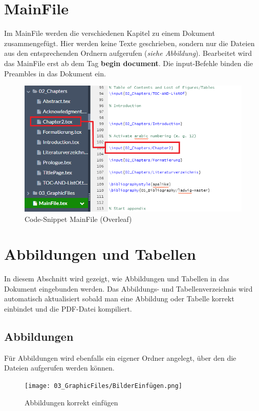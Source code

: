 \section{MainFile}\label{cha:mainFile}
Im MainFile werden die verschiedenen Kapitel zu einem Dokument zusammengefügt. Hier werden keine Texte geschrieben, sondern nur die Dateien aus den entsprechenden Ordnern aufgerufen (\emph{siehe Abbildung}). Bearbeitet wird das MainFile erst ab dem Tag \textbf{begin document}. Die input-Befehle binden die Preambles in das Dokument ein.

\begin{figure}[H]
    \centering
    \includegraphics[width=\textwidth]{03_GraphicFiles/MainFile.png}
    \caption{Code-Snippet MainFile (Overleaf)}
    \label{fig:mainFile}
\end{figure}

\section{Abbildungen und Tabellen}
In diesem Abschnitt wird gezeigt, wie Abbildungen und Tabellen in das Dokument eingebunden werden. Das Abbildungs- und Tabellenverzeichnis wird automatisch aktualisiert sobald man eine Abbildung oder Tabelle korrekt einbindet und die PDF-Datei kompiliert.

\subsection{Abbildungen} \label{cha:figures}
Für Abbildungen wird ebenfalls ein eigener Ordner angelegt, über den die Dateien aufgerufen werden können.

\begin{figure}[H]
    \centering
    \texttt{[image: 03\_GraphicFiles/BilderEinfügen.png]}
    \caption{Abbildungen korrekt einfügen}
    \label{fig:picture}
\end{figure}

